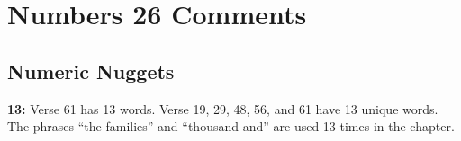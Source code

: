 \section{Numbers 26 Comments}

\subsection{Numeric Nuggets}
\textbf{13: } Verse 61 has 13 words. Verse 19, 29, 48, 56, and 61 have 13 unique words. The phrases  ``the families'' and ``thousand and'' are used 13 times in the chapter.
